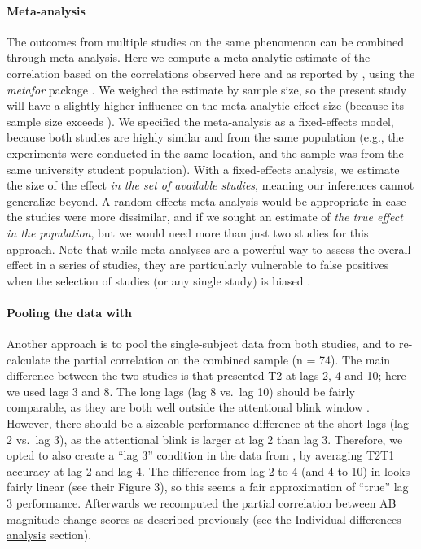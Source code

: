 \documentclass[11pt,english,]{memoir}
\let\oldparagraph\paragraph
\renewcommand{\paragraph}[1]{\oldparagraph{#1}\mbox{}}
\begin{document}
\hypertarget{meta}{%
\paragraph{Meta-analysis}\label{meta}}

The outcomes from multiple studies on the same phenomenon can be combined through meta-analysis. Here we compute a meta-analytic estimate of the correlation based on the correlations observed here and as reported by \textcite{London2015}, using the \emph{metafor} package \autocite[Version NA;][]{R-metafor}. We weighed the estimate by sample size, so the present study will have a slightly higher influence on the meta-analytic effect size (because its sample size exceeds \textcite{London2015}). We specified the meta-analysis as a fixed-effects model, because both studies are highly similar and from the same population (e.g., the experiments were conducted in the same location, and the sample was from the same university student population). With a fixed-effects analysis, we estimate the size of the effect \emph{in the set of available studies}, meaning our inferences cannot generalize beyond. A random-effects meta-analysis would be appropriate in case the studies were more dissimilar, and if we sought an estimate of \emph{the true effect in the population}, but we would need more than just two studies for this approach. Note that while meta-analyses are a powerful way to assess the overall effect in a series of studies, they are particularly vulnerable to false positives when the selection of studies (or any single study) is biased \autocite{Ueno2016}.

\hypertarget{pool}{%
\paragraph{\texorpdfstring{Pooling the data with \textcite{London2015}}{Pooling the data with @London2015}}\label{pool}}

Another approach is to pool the single-subject data from both studies, and to re-calculate the partial correlation on the combined sample (n = 74). The main difference between the two studies is that \textcite{London2015} presented T2 at lags 2, 4 and 10; here we used lags 3 and 8. The long lags (lag 8 vs.~lag 10) should be fairly comparable, as they are both well outside the attentional blink window \autocite[\textgreater{} 500 ms following T1;][]{MacLean2012}. However, there should be a sizeable performance difference at the short lags (lag 2 vs.~lag 3), as the attentional blink is larger at lag 2 than lag 3. Therefore, we opted to also create a ``lag 3'' condition in the data from \textcite{London2015}, by averaging T2\textbar{}T1 accuracy at lag 2 and lag 4. The difference from lag 2 to 4 (and 4 to 10) in \textcite{London2015} looks fairly linear (see their Figure 3), so this seems a fair approximation of ``true'' lag 3 performance. Afterwards we recomputed the partial correlation between AB magnitude change scores as described previously (see the \protect\hyperlink{AB_tDCS-ind-diffs}{Individual differences analysis} section).
\end{document}
